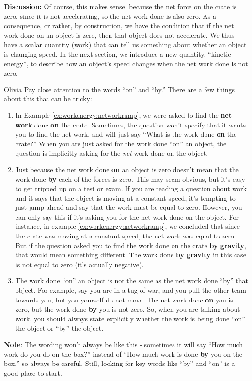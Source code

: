 \begin{example}
\textbf{Discussion:} Of course, this makes sense, because the net force on the crate is zero, since it is not accelerating, so the net work done is also zero. As a consequence, or rather, by construction, we have the condition that if the net work done on an object is zero, then that object does not accelerate. We thus have a scalar quantity (work) that can tell us something about whether an object is changing speed. In the next section, we introduce a new quantity, ``kinetic energy'', to describe how an object's speed changes when the net work done is not zero.
\end{example}

\newpage
\begin{studentOpinion}{Olivia} Pay close attention to the words ``on'' and ``by.'' There are a few things about this that can be tricky:
\begin{enumerate}
\item In Example \ref{ex:workenergy:networkramp}, we were asked to find the \textbf{net work} done \textbf{on} the crate. Sometimes, the question won't specify that it wants you to find the net work, and will just say ``What is the work done \textbf{on} the crate?'' When you are just asked for the work done ``on'' an object, the question is implicitly asking for the \textit{net} work done on the object. \\

\item Just because the net work done \textbf{on} an object is zero doesn't mean that the work done \textbf{by} each of the forces is zero. This may seem obvious, but it's easy to get tripped up on a test or exam. If you are reading a question about work and it says that the object is moving at a constant speed, it's tempting to just jump ahead and say that the work must be equal to zero. However, you can only say this if it's asking you for the net work done on the object. For instance, in example \ref{ex:workenergy:networkramp}, we concluded that since the crate was moving at a constant speed, the net work was equal to zero. But if the question asked you to find the work done on the crate \textbf{by gravity}, that would mean something different. The work done \textbf{by gravity} in this case is not equal to zero (it's actually negative). \\

\item The work done ``on'' an object is not the same as the net work done ``by'' that object. For example, say you are in a tug-of-war, and you pull the other team towards you, but you yourself do not move. The net work done \textbf{on} you is zero, but the work done \textbf{by} you is not zero. So, when you are talking about work, you should always state explicitly whether the work is being done ``on'' the object or ``by'' the object. 
\end{enumerate}
\textbf{Note}: The wording won't always be like this - sometimes it will say ``How much work do you do on the box?'' instead of ``How much work is done \textbf{by} you on the box,'' so always be careful. Still, looking for key words like ``by'' and ``on'' is a good place to start. 
\end{studentOpinion}

